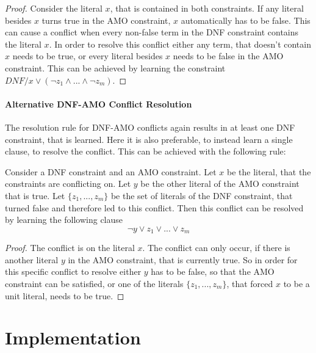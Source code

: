 \begin{proof}
Consider the literal $x$, that is contained in both constraints. If any literal besides $x$ turns true in the AMO constraint, $x$ automatically has to be false. This can cause a conflict when every non-false term in the DNF constraint contains the literal $x$. In order to resolve this conflict either any term, that doesn't contain $x$ needs to be true, or every literal besides $x$ needs to be false in the AMO constraint. This can be achieved by learning the constraint $DNF / x \vee (\neg z_1 \wedge ... \wedge \neg z_m)$.
\end{proof}

\subsubsection{Alternative DNF-AMO Conflict Resolution}

The resolution rule for DNF-AMO conflicts again results in at least one DNF constraint, that is learned. Here it is also preferable, to instead learn a single clause, to resolve the conflict. This can be achieved with the following rule:


\begin{lemma}
\begin{leftbar}
Consider a DNF constraint and an AMO constraint. Let $x$ be the literal, that the constraints are conflicting on. Let $y$ be the other literal of the AMO constraint that is true. Let $\{z_1,...,z_m\}$ be the set of literals of the DNF constraint, that turned false and therefore led to this conflict. Then this conflict can be resolved by learning the following clause
\begin{displaymath}
\neg y \vee z_1 \vee ... \vee z_m
\end{displaymath}
\end{leftbar}
\end{lemma}

\begin{proof}
The conflict is on the literal $x$. The conflict can only occur, if there is another literal $y$ in the AMO constraint, that is currently true. So in order for this specific conflict to resolve either $y$ has to be false, so that the AMO constraint can be satisfied, or one of the literals $\{z_1,...,z_m\}$, that forced $x$ to be a unit literal, needs to be true.
\end{proof}

\chapter{Implementation}
\label{ch:Implementation}

